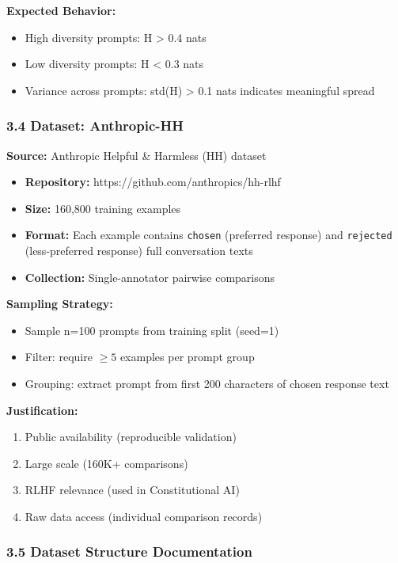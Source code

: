 \textbf{Expected Behavior:}
\begin{itemize}
\item High diversity prompts: H > 0.4 nats
\item Low diversity prompts: H < 0.3 nats
\item Variance across prompts: std(H) > 0.1 nats indicates meaningful spread
\end{itemize}

\subsubsection{3.4 Dataset: Anthropic-HH}

\textbf{Source:} Anthropic Helpful \& Harmless (HH) dataset \citep{bai2022constitutional}
\begin{itemize}
\item \textbf{Repository:} https://github.com/anthropics/hh-rlhf
\item \textbf{Size:} 160,800 training examples
\item \textbf{Format:} Each example contains \texttt{chosen} (preferred response) and \texttt{rejected} (less-preferred response) full conversation texts
\item \textbf{Collection:} Single-annotator pairwise comparisons
\end{itemize}

\textbf{Sampling Strategy:}
\begin{itemize}
\item Sample n=100 prompts from training split (seed=1)
\item Filter: require $\geq 5$ examples per prompt group
\item Grouping: extract prompt from first 200 characters of chosen response text
\end{itemize}

\textbf{Justification:}
\begin{enumerate}
\item Public availability (reproducible validation)
\item Large scale (160K+ comparisons)
\item RLHF relevance (used in Constitutional AI)
\item Raw data access (individual comparison records)
\end{enumerate}

\subsubsection{3.5 Dataset Structure Documentation}

